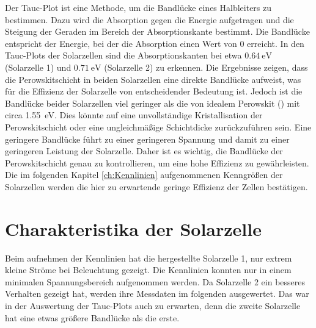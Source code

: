 \documentclass[12pt,a4paper,ngerman]{report}
\newcommand{\highlight}[1]{%
	\colorbox{yellow!50}{$\displaystyle#1$}} %
\begin{document}
		Der Tauc-Plot ist eine Methode, um die Bandlücke eines Halbleiters zu bestimmen. Dazu wird die Absorption gegen die Energie aufgetragen und die Steigung der Geraden im Bereich der Absorptionskante bestimmt. Die Bandlücke entspricht der Energie, bei der die Absorption einen Wert von 0 erreicht. In den Tauc-Plots der Solarzellen sind die Absorptionskanten bei etwa \highlight{\SI{0,64}{\eV}} (Solarzelle 1) und \highlight{\SI{0,71}{\eV}} (Solarzelle 2) zu erkennen. Die Ergebnisse zeigen, dass die Perowskitschicht in beiden Solarzellen eine direkte Bandlücke aufweist, was für die Effizienz der Solarzelle von entscheidender Bedeutung ist. Jedoch ist die Bandlücke beider Solarzellen viel geringer als die von idealem Perowskit () mit circa \SI{1.55}{\eV}. Dies könnte auf eine unvollständige Kristallisation der Perowskitschicht oder eine ungleichmäßige Schichtdicke zurückzuführen sein. Eine geringere Bandlücke führt zu einer geringeren Spannung und damit zu einer geringeren Leistung der Solarzelle. Daher ist es wichtig, die Bandlücke der Perowskitschicht genau zu kontrollieren, um eine hohe Effizienz zu gewährleisten. Die im folgenden Kapitel \ref{ch:Kennlinien} aufgenommenen Kenngrößen der Solarzellen werden die hier zu erwartende geringe Effizienz der Zellen bestätigen.

\section{Charakteristika der Solarzelle}
Beim aufnehmen der Kennlinien hat die hergestellte Solarzelle 1, nur extrem kleine Ströme bei Beleuchtung gezeigt. Die Kennlinien konnten nur in einem minimalen Spannungsbereich aufgenommen werden. Da Solarzelle 2 ein besseres Verhalten gezeigt hat, werden ihre Messdaten im folgenden ausgewertet. Das war in der Auswertung der Tauc-Plots auch zu erwarten, denn die zweite Solarzelle hat eine etwas größere Bandlücke als die erste. \\
\end{document}
